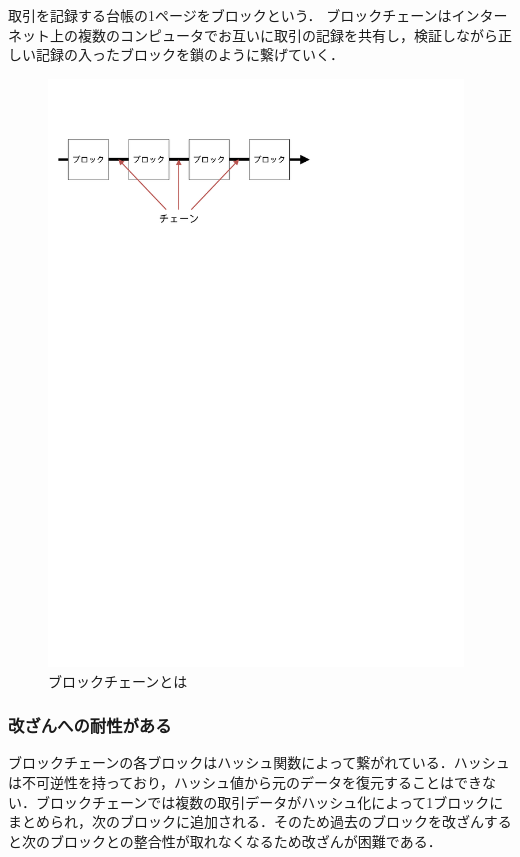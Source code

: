 \documentclass[a4j,12pt]{jsarticle}
\begin{document}
取引を記録する台帳の1ページをブロックという．
ブロックチェーンはインターネット上の複数のコンピュータでお互いに取引の記録を共有し，検証しながら正しい記録の入ったブロックを鎖のように繋げていく．

\begin{figure}[H]
\centering
\includegraphics[mediaboxonly=/CropBox,width=11cm]{block1.pdf}
\caption{ブロックチェーンとは}
\label{fig:no}
\end{figure} 


\subsubsection{改ざんへの耐性がある}
ブロックチェーンの各ブロックはハッシュ関数によって繋がれている．ハッシュは不可逆性を持っており，ハッシュ値から元のデータを復元することはできない．ブロックチェーンでは複数の取引データがハッシュ化によって1ブロックにまとめられ，次のブロックに追加される．そのため過去のブロックを改ざんすると次のブロックとの整合性が取れなくなるため改ざんが困難である．


\newpage
\end{document}
